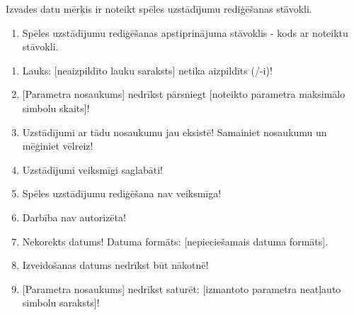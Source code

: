 {
	Izvades datu mērķis ir noteikt spēles uzstādījumu rediģēšanas stāvokli.
	\begin{enumerate}
		\item Spēles uzstādījumu rediģēšanas apstiprinājuma stāvoklis - kods ar noteiktu stāvokli.
	\end{enumerate}
}
{
	\begin{enumerate}
		\item Lauks: [neaizpildīto lauku saraksts] netika aizpildīts (/-i)!
		\item {}[Parametra nosaukums] nedrīkst pārsniegt [noteikto parametra maksimālo simbolu skaits]!
		\item Uzstādījumi ar tādu nosaukumu jau eksistē! Samainiet nosaukumu un mēģiniet vēlreiz!
		\item Uzstādījumi veiksmīgi saglabāti!
		\item Spēles uzstādījumu rediģēšana nav veiksmīga!
		\item Darbība nav autorizēta!
		\item Nekorekts datums! Datuma formāts: [nepieciešamais datuma formāts].
		\item Izveidošanas datums nedrīkst būt nākotnē!
		\item {}[Parametra nosaukums] nedrīkst saturēt: [izmantoto parametra neatļauto simbolu saraksts]!
	\end{enumerate}
}
